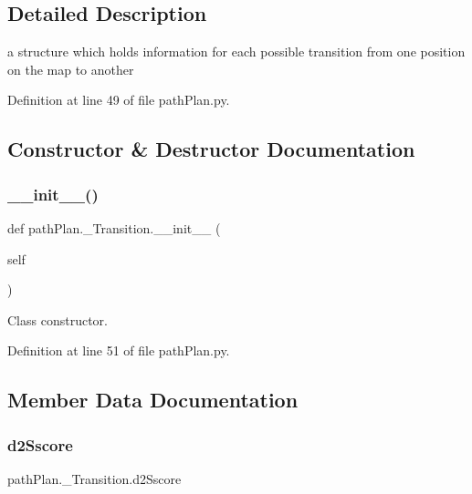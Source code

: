 \subsection{Detailed Description}
a structure which holds information for each possible transition from one position on the map to another 

Definition at line 49 of file path\+Plan.\+py.



\subsection{Constructor \& Destructor Documentation}
\mbox{\label{classpath_plan_1_1___transition_ae6a85dd74adbd4cda96fded2ba5d398e}} 
\subsubsection{\texorpdfstring{\+\_\+\+\_\+init\+\_\+\+\_\+()}{\_\_init\_\_()}}
{\footnotesize\ttfamily def path\+Plan.\+\_\+\+Transition.\+\_\+\+\_\+init\+\_\+\+\_\+ (\begin{DoxyParamCaption}\item[{}]{self }\end{DoxyParamCaption})}



Class constructor. 



Definition at line 51 of file path\+Plan.\+py.



\subsection{Member Data Documentation}
\mbox{\label{classpath_plan_1_1___transition_a03af53bb2bb866253742341b1c7b33fd}} 
\subsubsection{\texorpdfstring{d2\+Sscore}{d2Sscore}}
{\footnotesize\ttfamily path\+Plan.\+\_\+\+Transition.\+d2\+Sscore}



